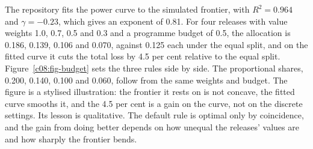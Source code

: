 The repository fits the power curve to the simulated frontier, with $R^2 = 0.964$
and $\gamma = -0.23$, which gives an exponent of 0.81. For four releases with value
weights 1.0, 0.7, 0.5 and 0.3 and a programme budget of 0.5, the allocation is
0.186, 0.139, 0.106 and 0.070, against 0.125 each under the equal split, and on the
fitted curve it cuts the total loss by 4.5 per cent relative to the equal split.
Figure~\ref{c08:fig-budget} sets the three rules side by side. The proportional
shares, 0.200, 0.140, 0.100 and 0.060, follow from the same weights and budget.
The figure is a stylised illustration: the frontier it rests on is not concave, the
fitted curve smooths it, and the 4.5 per cent is a gain on the curve, not on the
discrete settings. Its lesson is qualitative. The default rule is optimal only by
coincidence, and the gain from doing better depends on how unequal the releases'
values are and how sharply the frontier bends.

